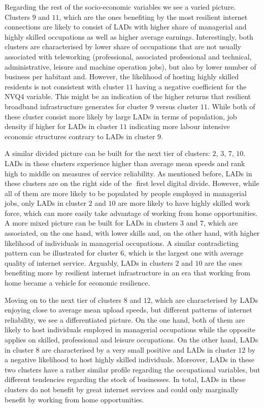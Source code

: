 \documentclass[,]{sagej}
\begin{document}
Regarding the rest of the socio-economic variables we see a varied
picture. Clusters \(9\) and \(11\), which are the ones benefiting by the
most resilient internet connections are likely to consist of LADs with
higher share of managerial and highly skilled occupations as well as
higher average earnings. Interestingly, both clusters are characterised
by lower share of occupations that are not usually associated with
teleworking (professional, associated professional and technical,
administrative, leisure and machine operation jobs), but also by lower
number of business per habitant and. However, the likelihood of hosting
highly skilled residents is not consistent with cluster \(11\) having a
negative coefficient for the NVQ4 variable. This might be an indication
of the higher returns that resilient broadband infrastructure generates
for cluster \(9\) versus cluster \(11\). While both of these cluster
consist more likely by large LADs in terms of population, job density if
higher for LADs in cluster \(11\) indicating more labour intensive
economic structures contrary to LADs in cluster \(9\).

A similar divided picture can be built for the next tier of clusters:
\(2\), \(3\), \(7\), \(10\). LADs in these clusters experience higher
than average mean speeds and rank high to middle on measures of service
reliability. As mentioned before, LADs in these clusters are on the
right side of the first level digital divide. However, while all of
them are more likely to be populated by people employed in managerial
jobs, only LADs in cluster \(2\) and \(10\) are more likely to have
highly skilled work force, which can more easily take advantage of
working from home opportunities. A more mixed picture can be built for
LADs in clusters \(3\) and \(7\), which are associated, on the one hand,
with lower skills and, on the other hand, with higher likelihood of
individuals in managerial occupations. A similar contradicting pattern
can be illustrated for cluster \(6\), which is the largest one with
average quality of internet service. Arguably, LADs in clusters \(2\)
and \(10\) are the ones benefiting more by resilient internet
infrastructure in an era that working from home became a vehicle for
economic resilience.

Moving on to the next tier of clusters \(8\) and \(12\), which are
characterised by LADs enjoying close to average mean upload speeds, but
different patterns of internet reliability, we see a differentiated
picture. On the one hand, both of them are likely to host individuals
employed in managerial occupations while the opposite applies on
skilled, professional and leisure occupations. On the other hand, LADs
in cluster \(8\) are characterised by a very small positive and LADs in
cluster \(12\) by a negative likelihood to host highly skilled
individuals. Moreover, LADs in these two clusters have a rather similar
profile regarding the occupational variables, but different tendencies
regarding the stock of businesses. In total, LADs in these clusters do
not benefit by great internet services and could only marginally benefit
by working from home opportunities.
\end{document}
